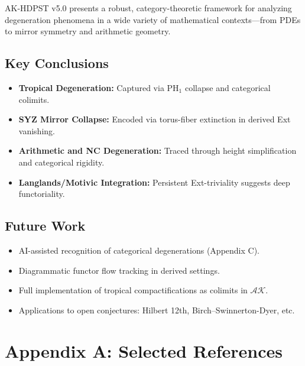 \documentclass[11pt]{article}
\begin{document}
AK-HDPST v5.0 presents a robust, category-theoretic framework for analyzing degeneration phenomena in a wide variety of mathematical contexts—from PDEs to mirror symmetry and arithmetic geometry.

\subsection*{Key Conclusions}
\begin{itemize}
    \item \textbf{Tropical Degeneration:} Captured via PH\(_1\) collapse and categorical colimits.
    \item \textbf{SYZ Mirror Collapse:} Encoded via torus-fiber extinction in derived Ext vanishing.
    \item \textbf{Arithmetic and NC Degeneration:} Traced through height simplification and categorical rigidity.
    \item \textbf{Langlands/Motivic Integration:} Persistent Ext-triviality suggests deep functoriality.
\end{itemize}

\subsection*{Future Work}
\begin{itemize}
    \item AI-assisted recognition of categorical degenerations (Appendix C).
    \item Diagrammatic functor flow tracking in derived settings.
    \item Full implementation of tropical compactifications as colimits in \( \mathcal{AK} \).
    \item Applications to open conjectures: Hilbert 12th, Birch–Swinnerton-Dyer, etc.
\end{itemize}




\section*{Appendix A: Selected References}
\end{document}
